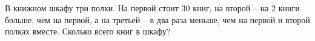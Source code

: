 \begin{ex}
	\begin{condition}
		В книжном шкафу три полки. На первой стоит \( 30 \) книг, на второй – на \( 2 \) книги больше,
		чем на первой, а на третьей – в два раза меньше, чем на первой и второй полках вместе.
		Сколько всего книг в шкафу?
	\end{condition}
\end{ex}